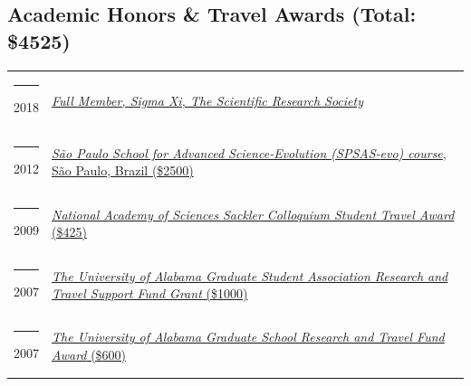 \documentclass[margin,line]{res}
\begin{document}
\begin{resume}
\section{\sc Academic Honors \& Travel Awards (Total: \$4525)}
\begin{longtable}{@{}p{0.7in}p{4in}}
\hspace*{-4mm} \rule{-1mm}{5mm} 2018 & \href{https://www.sigmaxi.org}{\textit{Full Member, Sigma Xi, The Scientific Research Society}}\\*
\hspace*{-4mm} \rule{-1mm}{5mm} 2012 & \href{http://espca.fapesp.br/school/spsas_evo_____sao_paulo_school_of_advanced_science_evolution/43/}{\textit{S\~{a}o Paulo School for Advanced Science-Evolution (SPSAS-\emph{evo}) course}, S\~{a}o Paulo, Brazil (\$2500)}\\*
\hspace*{-4mm} \rule{-1mm}{5mm} 2009 & \href{http://www.nasonline.org/programs/nas-colloquia/}{\textit{National Academy of Sciences Sackler Colloquium Student Travel Award} (\$425)}\\*
\hspace*{-4mm} \rule{-1mm}{5mm} 2007 & \href{https://graduate.ua.edu}{\textit{The University of Alabama Graduate Student Association Research and Travel Support Fund Grant} (\$1000)}\\*
\hspace*{-4mm} \rule{-1mm}{5mm} 2007 & \href{https://graduate.ua.edu}{\textit{The University of Alabama Graduate School Research and Travel Fund Award} (\$600)}\\*
\end{longtable}





\end{resume}
\end{document}
